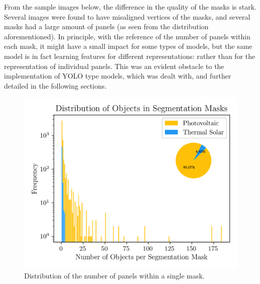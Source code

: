 \documentclass[conference]{IEEEtran}
\begin{document}
From the sample images below, the difference in the quality of the masks is stark. Several images were found to have misaligned vertices of the masks, and several masks had a large amount of panels (as seen from the distribution aforementioned). In principle, with the reference of the number of panels within each mask, it might have a small impact for some types of models, but the same model is in fact learning features for different representations: rather than for the representation of individual panels. This was an evident obstacle to the implementation of YOLO type models, which was dealt with, and further detailed in the following sections.

\begin{figure}[H]
    \centering
    \includegraphics[width=1\linewidth]{assets/data_objectdistribution_ph.png}
    \caption{Distribution of the number of panels within a single mask.}
    \label{fig:data_objectdistribution}
\end{figure}
\end{document}
